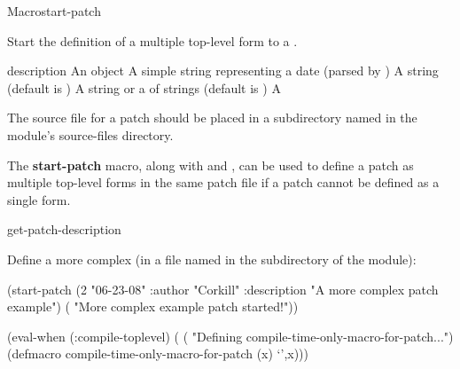 \documentclass[10pt,twoside,english,pdftex]{article}
\begin{document}
\begin{functiondoc}{Macro}{start-patch}%
  {
    }
%
%

\fnsyntax 

\fnpurpose Start the definition of a multiple top-level form  to
a .

\fnpackage {}

\fnmodule {}

\fnargs
\begin{args}{description}
\arg[id] An object
\arg[date] A simple string representing a date (parsed by 
  )
\arg[author] A string (default is )
\arg[description] A string or a  of strings (default is \nil)
\arg[form] A 
\end{args}

\fndescription 
%
The source file for a patch should be placed in a subdirectory named
 in the module's source-files directory.

The \textbf{start-patch} macro, along with
 and
, can be used to define a patch as
multiple top-level forms in the same patch file if a patch cannot be defined
as a single  form.

\begin{alsos}{get-patch-description}
\also[patch]
\also[undefmethod]
\end{alsos}

\fnexample 
%
Define a more complex  (in a file named
 in the  subdirectory of
the module):
%
%
%
%
%
\W\supp
\begin{example}
  (start-patch (2 "06-23-08" 
                  :author "Corkill"
                  :description "A more complex patch example")
      ( "More complex example patch started!"))

  (eval-when (:compile-toplevel)
    (
     ( "Defining compile-time-only-macro-for-patch...")
     (defmacro compile-time-only-macro-for-patch (x)
       `',x)))


\end{example}
\end{functiondoc}
\end{document}

